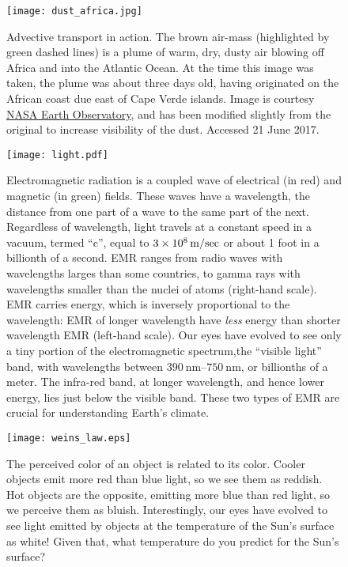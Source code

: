\documentclass[amstex,12pt]{book}
\begin{document}
\begin{figure}[p]
\centering
\texttt{[image: dust\_africa.jpg]}%
\caption{Advective transport in action. The brown air-mass (highlighted by green dashed lines) is a plume of warm, dry, dusty air blowing off Africa and into the Atlantic Ocean. At the time this image was taken, the plume was about three days old, having originated on the African coast due east of Cape Verde islands. Image is courtesy \href{https://earthobservatory.nasa.gov/IOTD/view.php?id=85423}{NASA Earth Observatory}, and has been modified slightly from the original to increase visibility of the dust. Accessed 21 June 2017.}
\label{fig:dust_africa}
\end{figure}

\begin{figure}[p]
\centering
\texttt{[image: light.pdf]}%
\caption{Electromagnetic radiation is a coupled wave of electrical (in red) and magnetic (in green) fields. These waves have a wavelength, the distance from one part of a wave to the same part of the next.  Regardless of wavelength, light travels at a constant speed in a vacuum, termed ``c'', equal to $\SI{3d8}{\metre\per\sec}$ or about 1 foot in a billionth of a second. EMR ranges from radio waves with wavelengths larges than some countries, to gamma rays with wavelengths smaller than the nuclei of atoms (right-hand scale). EMR carries energy, which is inversely proportional to the wavelength: EMR of longer wavelength have \emph{less} energy than shorter wavelength EMR (left-hand scale). Our eyes have evolved to see only a tiny portion of the electromagnetic spectrum,the ``visible light'' band, with wavelengths between $\SIrange{390}{750}{\nano\metre}$, or billionths of a meter. The infra-red band, at longer wavelength, and hence lower energy, lies just below the visible band. These two types of EMR are crucial for understanding Earth's climate.}
\label{fig:light}
\end{figure}


\begin{figure}[p]
\centering
\texttt{[image: weins\_law.eps]}%
\caption{The perceived color of an object is related to its color. Cooler objects emit more red than blue light, so we see them as reddish. Hot objects are the opposite, emitting more blue than red light, so we perceive them as bluish. Interestingly, our eyes have evolved to see light emitted by objects at the temperature of the Sun’s surface as white! Given that, what temperature do you predict for the Sun's surface?}
\label{fig:weins_law}
\end{figure}
\end{document}
